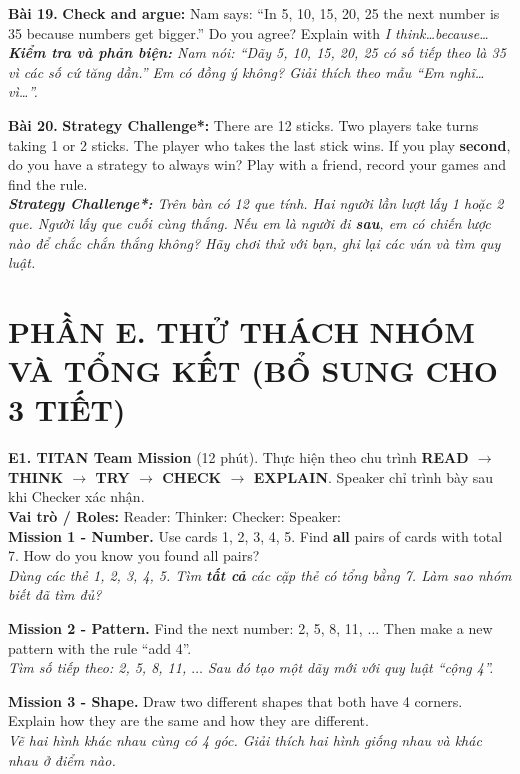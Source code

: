 \documentclass[11pt,a4paper]{article}
\newcommand{\answerline}{\noindent\dotfill\par\vspace{0.8mm}}
\newcommand{\shortblank}[1]{\makebox[#1]{\dotfill}}
\begin{document}
\textbf{Bài 19.} \textbf{Check and argue:} Nam says: ``In 5, 10, 15, 20, 25 the next number is 35 because numbers get bigger.'' Do you agree? Explain with \textit{I think\ldots because\ldots}\\
\textit{\textbf{Kiểm tra và phản biện:} Nam nói: ``Dãy 5, 10, 15, 20, 25 có số tiếp theo là 35 vì các số cứ tăng dần.'' Em có đồng ý không? Giải thích theo mẫu ``Em nghĩ\ldots vì\ldots''.}\\
\answerline
\answerline
\answerline

\textbf{Bài 20.} \textbf{Strategy Challenge*:} There are 12 sticks. Two players take turns taking 1 or 2 sticks. The player who takes the last stick wins. If you play \textbf{second}, do you have a strategy to always win? Play with a friend, record your games and find the rule.\\
\textit{\textbf{Strategy Challenge*:} Trên bàn có 12 que tính. Hai người lần lượt lấy 1 hoặc 2 que. Người lấy que cuối cùng thắng. Nếu em là người đi \textbf{sau}, em có chiến lược nào để chắc chắn thắng không? Hãy chơi thử với bạn, ghi lại các ván và tìm quy luật.}\\
\answerline
\answerline
\answerline
\answerline

\newpage
\section*{PHẦN E. THỬ THÁCH NHÓM VÀ TỔNG KẾT (BỔ SUNG CHO 3 TIẾT)}
\textbf{E1. TITAN Team Mission} (12 phút). Thực hiện theo chu trình \textbf{READ $\rightarrow$ THINK $\rightarrow$ TRY $\rightarrow$ CHECK $\rightarrow$ EXPLAIN}. Speaker chỉ trình bày sau khi Checker xác nhận.\\
\textbf{Vai trò / Roles:} Reader: \shortblank{30mm} Thinker: \shortblank{30mm} Checker: \shortblank{30mm} Speaker: \shortblank{30mm}\\[1mm]
\textbf{Mission 1 - Number.} Use cards 1, 2, 3, 4, 5. Find \textbf{all} pairs of cards with total 7. How do you know you found all pairs?\\
\textit{Dùng các thẻ 1, 2, 3, 4, 5. Tìm \textbf{tất cả} các cặp thẻ có tổng bằng 7. Làm sao nhóm biết đã tìm đủ?}\\
\answerline
\answerline
\textbf{Mission 2 - Pattern.} Find the next number: 2, 5, 8, 11, $\ldots$ Then make a new pattern with the rule ``add 4''.\\
\textit{Tìm số tiếp theo: 2, 5, 8, 11, $\ldots$ Sau đó tạo một dãy mới với quy luật ``cộng 4''.}\\
\answerline
\answerline
\textbf{Mission 3 - Shape.} Draw two different shapes that both have 4 corners. Explain how they are the same and how they are different.\\
\textit{Vẽ hai hình khác nhau cùng có 4 góc. Giải thích hai hình giống nhau và khác nhau ở điểm nào.}
\vspace{2cm}
\end{document}
